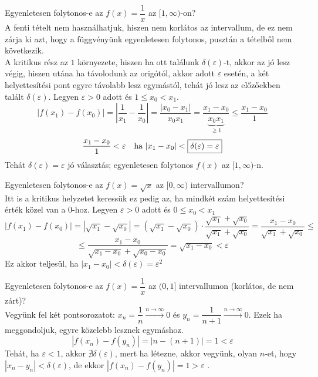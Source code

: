 \documentclass[a4paper,12pt,twoside]{book}
\theoremstyle{break}
\theoremstyle{plain}
\begin{document}
\begin{enumerate*}
\item Egyenletesen folytonos-e az $f(x)=\dfrac{1}{x}$ az $[1,\infty)$-on?\\
A fenti tételt nem használhatjuk, hiszen nem korlátos az intervallum, de ez nem zárja ki azt, hogy a függvényünk egyenletesen folytonos, pusztán a tételből nem következik.\\
A kritikus rész az $1$ környezete, hiszen ha ott találunk $\delta(\varepsilon)$-t, akkor az jó lesz végig, hiszen utána ha távolodunk az origótól, akkor adott $\varepsilon$ esetén, a két helyettesítési pont egyre távolabb lesz egymástól, tehát jó lesz az előzőekben talált $\delta(\varepsilon)$. Legyen $\varepsilon > 0$ adott és $1\leqslant x_0 < x_1$.
\[|f(x_1)-f(x_0)|=\left|\frac{1}{x_1}-\frac{1}{x_0}\right|=\frac{|x_0-x_1|}{x_0x_1} = \frac{x_1-x_0}{\underbrace{x_0x_1}_{\geqslant 1}} \leqslant \frac{x_1-x_0}{1}\]
\[\frac{x_1-x_0}{1} < \varepsilon \quad \hbox{ha } |x_1-x_0|<\boxed{\delta(\varepsilon)=\varepsilon}\]
Tehát $\delta(\varepsilon)=\varepsilon$ jó választás; egyenletesen folytonos $f(x)$ az $[1, \infty)$-n.\\

\item Egyenletesen folytonos-e az $f(x)=\sqrt{x}$ az $[0, \infty)$ intervallumon?\\
Itt is a kritikus helyzetet keressük ez pedig az, ha mindkét szám helyettesítési érték közel van a 0-hoz. Legyen $\varepsilon > 0$ adott és $0\leqslant x_0 < x_1$
\[|f(x_1)-f(x_0)|=|\sqrt{x_1}-\sqrt{x_0}|=(\sqrt{x_1}-\sqrt{x_0})\cdot\frac{\sqrt{x_1}+\sqrt{x_0}}{\sqrt{x_1}+\sqrt{x_0}}=\frac{x_1-x_0}{\sqrt{x_1}+\sqrt{x_0}} \leqslant\]
\[ \leqslant \frac{x_1-x_0}{\sqrt{x_1-x_0}+\sqrt{x_0-x_0}}=\sqrt{x_1-x_0} < \varepsilon\]
Ez akkor teljesül, ha $|x_1-x_0|<\boxed{\delta(\varepsilon) = \varepsilon^2}$\\

\item Egyenletesen folytonos-e az $f(x)=\dfrac{1}{x}$ az $(0, 1]$ intervallumon (korlátos, de nem zárt)?\\
Vegyünk fel két pontsorozatot: $x_n = \dfrac{1}{n} \xrightarrow{n\to\infty} 0$ és $y_n = \dfrac{1}{n+1} \xrightarrow{n\to\infty} 0$. Ezek ha meggondoljuk, egyre közelebb lesznek egymáshoz.
\[|f(x_n)-f(y_n)|=|n-(n+1)|=1 < \varepsilon\]
Tehát, ha $\varepsilon < 1$, akkor $\nexists \delta(\varepsilon)$, mert ha létezne, akkor vegyünk, olyan $n$-et, hogy $|x_n-y_n|<\delta(\varepsilon)$, de ekkor $|f(x_n)-f(y_n)|=1 > \varepsilon$ \blitza.
\end{enumerate*}
\end{document}
